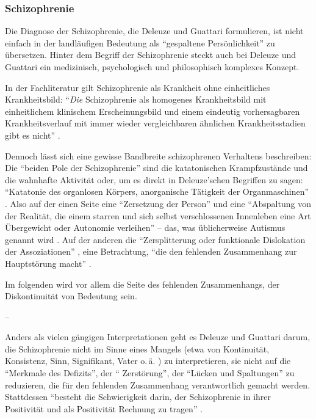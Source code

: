 \documentclass[12pt,
               DIV13,
               paper=a4,
               twoside=false,
               onehalfspacing,
               bibliography=totoc,
               toc=graduated,
               draft,
               ]{scrartcl}
\newcommand{\pc}[2]{\parencite[#1]{#2}}
\newcommand{\vgl}[2]{\parencite[vgl.][#1]{#2}}
\newcommand{\worries}[1]{\ifdraft{\textcolor{blue}{\texttt{(#1)}}}{}}
\newcommand{\gwg}{G--W--G'\xspace}
\begin{document}
\subsubsection{Schizophrenie}

Die Diagnose der Schizophrenie, die Deleuze und Guattari formulieren,
ist nicht einfach in der landläufigen Bedeutung als "`gespaltene
Persönlichkeit"' zu übersetzen. Hinter dem Begriff der Schizophrenie
steckt auch bei Deleuze und Guattari ein medizinisch, psychologisch
und philosophisch komplexes Konzept.

In der Fachliteratur gilt Schizophrenie als Krankheit ohne
einheitliches Krankheitsbild: "`\emph{Die} Schizophrenie als homogenes
Krankheitsbild mit einheitlichem klinischem Erscheinungsbild und einem
eindeutig vorhersagbaren Krankheitsverlauf mit immer wieder
vergleichbaren ähnlichen Krankheitsstadien gibt es nicht"'
\pc{799}{psych}.

Dennoch lässt sich eine gewisse Bandbreite schizophrenen Verhaltens
beschreiben: Die "`beiden Pole der Schizophrenie"' \pc{21}{schizg}
sind die katatonischen Krampfzustände und die wahnhafte Aktivität
oder, um es direkt in Deleuze'schen Begriffen zu sagen: "`Katatonie
des organlosen Körpers, anorganische Tätigkeit der Organmaschinen"'
\pc{21}{schizg}. Also auf der einen Seite eine "`Zersetzung der
Person"' und eine "`Abspaltung von der Realität, die einem starren und
sich selbst verschlossenen Innenleben eine Art Übergewicht oder
Autonomie verleihen"' \pc{23}{schizg} -- das, was üblicherweise
Autismus genannt wird \vgl{801}{psych}. Auf der anderen die
"`Zersplitterung oder funktionale Dislokation der Assoziationen"'
\pc{23}{schizg}, eine Betrachtung, "`die den fehlenden Zusammenhang
zur Hauptstörung macht"' \pc{23}{schizg}.

\worries{\gwg auch als Autismus?}

Im folgenden wird vor allem die Seite des fehlenden Zusammenhangs, der
Diskontinuität von Bedeutung sein.

--

Anders als vielen gängigen Interpretationen geht es Deleuze und
Guattari darum, die Schizophrenie nicht im Sinne eines Mangels (etwa
von Kontinuität, Konsistenz, Sinn, Signifikant, Vater o.\,ä.
\vgl{24}{schizg} \worries{+ ganz woanders?}) zu interpretieren, sie
nicht auf die "`Merkmale des Defizits"', der "` Zerstörung"', der
"`Lücken und Spaltungen"' \pc{24}{schizg} zu reduzieren, die für den
fehlenden Zusammenhang verantwortlich gemacht werden. Stattdessen
"`besteht die Schwierigkeit darin, der Schizophrenie in ihrer
Positivität und als Positivität Rechnung zu tragen"' \pc{24}{schizg}.
\end{document}
